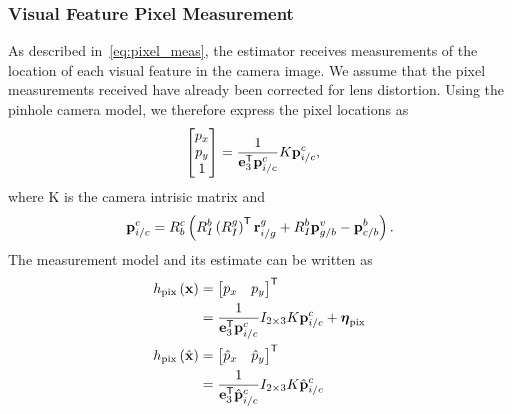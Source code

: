 \subsubsection{Visual Feature Pixel Measurement}
As described in~\eqref{eq:pixel_meas}, the estimator receives measurements of
the location of each visual feature in the camera image. We assume that the
pixel measurements received have already been corrected for lens distortion.
Using the pinhole camera model, we therefore express the pixel locations as
\begin{align}
  \begin{bmatrix}
    p_x \\ p_y \\ 1
  \end{bmatrix} &= \frac{1}{\boldsymbol{\mathrm{e}}_3^{\mathsf{T}} \boldsymbol{\mathrm{p}}_{i/c}^c} K
  \boldsymbol{\mathrm{p}}_{i/c}^c,
\end{align}
where K is the camera intrisic matrix and 
\begin{align}
  \boldsymbol{\mathrm{p}}_{i/c}^c = R_b^c \left( R_I^b \left( R_I^g \right)^{\mathsf{T}}
  \boldsymbol{\mathrm{r}}_{i/g}^g + R_I^b \boldsymbol{\mathrm{p}}_{g/b}^v - \boldsymbol{\mathrm{p}}_{c/b}^b \right).
  \label{eq:p_i_c_c}
\end{align}
The measurement model and its estimate can be written as
\begin{align}
  h_{\text{pix}} \left( \boldsymbol{\mathrm{x}} \right)
  &= \begin{bmatrix} p_x & p_y \end{bmatrix}^{\mathsf{T}} \\
  &= \frac{1}{\boldsymbol{\mathrm{e}}_3^{\mathsf{T}} \boldsymbol{\mathrm{p}}_{i/c}^c} I_{2 \times 3} K
  \boldsymbol{\mathrm{p}}_{i/c}^c + \boldsymbol{\mathrm{\eta}}_{\text{pix}} \\
  h_{\text{pix}} \left( \hat{\boldsymbol{\mathrm{x}}} \right)
  &= \begin{bmatrix} \hat{p}_x & \hat{p}_y \end{bmatrix}^{\mathsf{T}} \\
  &= \frac{1}{\boldsymbol{\mathrm{e}}_3^{\mathsf{T}} \hat{\boldsymbol{\mathrm{p}}}_{i/c}^c} I_{2 \times 3} K
  \hat{\boldsymbol{\mathrm{p}}}_{i/c}^c
\end{align}
